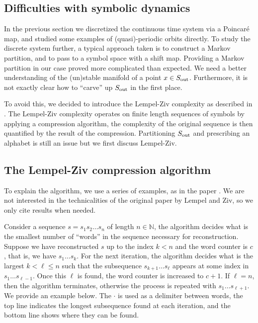\subsection{Difficulties with symbolic dynamics}

In the previous section we discretized the continuous time system via a Poincar\'e map, and studied some examples of (quasi)-periodic orbits directly. To study the discrete system further, a typical approach taken is to construct a Markov partition, and to pass to a symbol space with a shift map. Providing a Markov partition in our case proved more complicated than expected. We need a better understanding of the (un)stable manifold of a point $x\in S_\text{out}$. Furthermore, it is not exactly clear how to ``carve'' up $S_\text{out}$ in the first place.

To avoid this, we decided to introduce the Lempel-Ziv complexity as described in \cite{LZ76}. The Lempel-Ziv complexity operates on finite length sequences of symbols by applying a compression algorithm, the complexity of the original sequence is then quantified by the result of the compression. Partitioning $S_\text{out}$ and prescribing an alphabet is still an issue but we first discuss Lempel-Ziv.

\subsection{The Lempel-Ziv compression algorithm}

To explain the algorithm, we use a series of examples, as in the paper \cite{Kaspar1987EasilyCM}. We are not interested in the technicalities of the original paper by Lempel and Ziv, so we only cite results when needed.

Consider a sequence $s=s_1s_2\dots s_n$ of length $n\in\mathbb N$, the algorithm decides what is the smallest number of ``words'' in the sequence necessary for reconstruction. Suppose we have reconstructed $s$ up to the index $k<n$ and the word counter is $c$, that is, we have $s_1\dots s_k$. For the next iteration, the algorithm decides what is the largest $k<\ell\le n$ such that the subsequence $s_{k+1}\dots s_\ell$ appears at some index in $s_1\dots s_{\ell-1}$. Once this $\ell$ is found, the word counter is increased to $c+1$. If $\ell =n$, then the algorithm terminates, otherwise the process is repeated with $s_1\dots s_{\ell+1}$. We provide an example below. The $\cdot$ is used as a delimiter between words, the top line indicates the longest subsequence found at each iteration, and the bottom line shows where they can be found.

